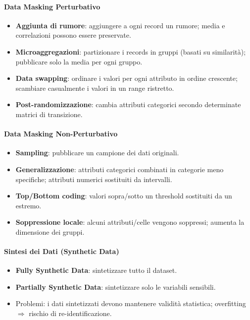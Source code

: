 \documentclass[a4paper,11pt]{article}
\begin{document}
\paragraph{Data Masking Perturbativo}
\begin{itemize}
  \item \textbf{Aggiunta di rumore}: aggiungere a ogni record un rumore; media e correlazioni possono essere preservate.
  \item \textbf{Microaggregazioni}: partizionare i records in gruppi (basati su similarit\`{a}); pubblicare solo la media per ogni gruppo.
  \item \textbf{Data swapping}: ordinare i valori per ogni attributo in ordine crescente; scambiare casualmente i valori in un range ristretto.
  \item \textbf{Post-randomizzazione}: cambia attributi categorici secondo determinate matrici di transizione.
\end{itemize}

\paragraph{Data Masking Non-Perturbativo}
\begin{itemize}
  \item \textbf{Sampling}: pubblicare un campione dei dati originali.
  \item \textbf{Generalizzazione}: attributi categorici combinati in categorie meno specifiche; attributi numerici sostituiti da intervalli.
  \item \textbf{Top/Bottom coding}: valori sopra/sotto un threshold sostituiti da un estremo.
  \item \textbf{Soppressione locale}: alcuni attributi/celle vengono soppressi; aumenta la dimensione dei gruppi.
\end{itemize}

\paragraph{Sintesi dei Dati (Synthetic Data)}
\begin{itemize}
  \item \textbf{Fully Synthetic Data}: sintetizzare tutto il dataset.
  \item \textbf{Partially Synthetic Data}: sintetizzare solo le variabili sensibili.
  \item Problemi: i dati sintetizzati devono mantenere validit\`{a} statistica; overfitting $\Rightarrow$ rischio di re-identificazione.
\end{itemize}
\end{document}
